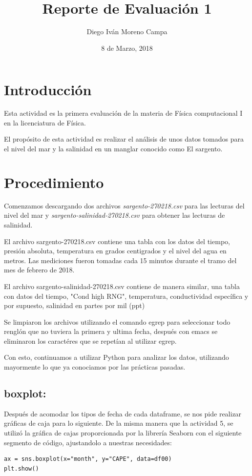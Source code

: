 \documentclass{article}
\title{Reporte de Evaluación 1}
\author{Diego Iván Moreno Campa}
\date{8 de Marzo, 2018}
\begin{document}
\maketitle

\bigskip

\section{Introducción}

Esta actividad es la primera evaluación de la materia de Física computacional I en la licenciatura de Física.

El propósito de esta actividad es realizar el análisis de unos datos tomados para el nivel del mar y la salinidad en un manglar conocido como El sargento.

\section{Procedimiento}

Comenzamos descargando dos archivos \textit{sargento-270218.csv} para las lecturas del nivel del mar y \textit{sargento-salinidad-270218.csv} para obtener las lecturas de salinidad.

El archivo sargento-270218.csv contiene una tabla con los datos del tiempo, presión absoluta, temperatura en grados centigrados y el nivel del agua en metros. Las mediciones fueron tomadas cada 15 minutos durante el tramo del mes de febrero de 2018.

El archivo sargento-salinidad-270218.csv contiene de manera similar, una tabla con datos del tiempo, "Cond high RNG", temperatura, conductividad específica y por supuesto, salinidad en partes por mil (ppt)

Se limpiaron los archivos utilizando el comando egrep para seleccionar todo renglón que no tuviera la primera y ultima fecha, después con emacs se eliminaron los caractéres que se repetían al utilizar egrep.

Con esto, continuamos a utilizar Python para analizar los datos, utilizando mayormente lo que ya conociamos por las prácticas pasadas.

\subsection{boxplot:}

Después de acomodar los tipos de fecha de cada dataframe, se nos pide realizar gráficas de caja para lo siguiente.
De la misma manera que la actividad 5, se utilizó la gráfica de cajas proporcionada por la librería Seaborn con el siguiente segmento de código, ajustandolo a nuestras necesidades:
\begin{verbatim}
ax = sns.boxplot(x="month", y="CAPE", data=df00)
plt.show()
\end{verbatim}
\end{document}
